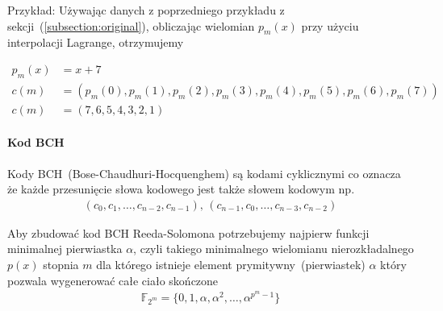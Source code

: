 \begin{minipage}{\textwidth}
Przykład:
\newline
Używając danych z poprzedniego przykładu z sekcji~(\ref{subsection:original}),
obliczając wielomian $p_m(x)$ przy użyciu interpolacji Lagrange, otrzymujemy
\end{minipage}
\begin{align*}
    p_m(x) &= x + 7 \\
    c(m) &= (p_m(0), p_m(1), p_m(2), p_m(3), p_m(4), p_m(5), p_m(6), p_m(7)) \\
    c(m) &= (7, 6, 5, 4, 3, 2, 1)
\end{align*}

\paragraph{Kod BCH}

Kody BCH~(Bose-Chaudhuri-Hocquenghem) są kodami cyklicznymi co oznacza że każde przesunięcie słowa kodowego jest także słowem kodowym np.
\begin{align*}
    (c_0, c_1,\ldots, c_{n-2}, c_{n-1})\text{, }(c_{n-1}, c_0, \ldots, c_{n-3}, c_{n-2})
\end{align*}

Aby zbudować kod BCH Reeda-Solomona potrzebujemy najpierw funkcji minimalnej pierwiastka $\alpha$, czyli takiego minimalnego wielomianu nierozkładalnego $p(x)$ stopnia $m$ dla którego istnieje element prymitywny~(pierwiastek) $\alpha$ który pozwala wygenerować całe ciało skończone
\begin{align*}
    \mathbb{F}_{2^m} = \{0, 1, \alpha, \alpha^2, \ldots, \alpha^{p^{m}-1} \}
\end{align*}

